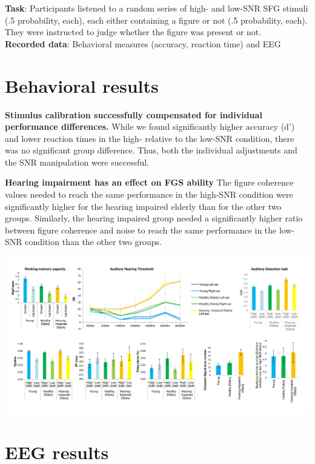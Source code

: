 \documentclass[a0,portrait]{a0poster}
\begin{document}
\begin{multicols}{2}
\textbf{Task}: Participants listened to a random series of high- and low-SNR SFG stimuli (.5 probability, each), each either containing a figure or not (.5 probability, each). They were instructed to judge whether the figure was present or not. \\
\textbf{Recorded data}: Behavioral measures (accuracy, reaction time) and EEG
\section*{Behavioral results}

	 \textbf{Stimulus calibration successfully compensated for individual performance differences.} While we found significantly higher accuracy (d') and lower reaction times in the high- relative to the low-SNR condition, there was no significant group difference. Thus, both the individual adjustments and the SNR manipulation were successful.
	
	 \textbf{Hearing impairment has an effect on FGS ability} The figure coherence
	 values needed to reach the same performance in the high-SNR condition
	 were significantly higher for the hearing impaired elderly than for the
	 other two groups. Similarly, the hearing impaired group needed a 
	 significantly higher ratio between figure coherence and noise to reach
	 the same performance in the low-SNR condition than the other two groups.
	 
	 \begin{center}\vspace{0cm}
	 	\includegraphics[width=0.95\linewidth]{Fig_behav.png}
	 \end{center}\vspace{0cm}
 
 
 \section*{EEG results}
	

\end{multicols}
\end{document}
